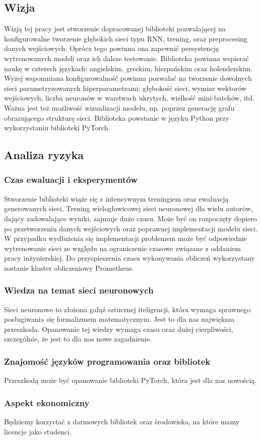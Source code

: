 \subsection{Wizja}
Wizją tej pracy jest stworzenie dopracowanej biblioteki pozwalającej na konfigurowalne tworzenie 
głębokich sieci typu RNN, trening, oraz preprocesing danych wejściowych. Oprócz tego powinna ona 
zapewnić persystencję wytrenowanych modeli oraz ich dalsze testowanie. Biblioteka powinna wspierać 
naukę w czterech językach: angielskim, greckim, hiszpańskim oraz holenderskim. Wyżej wspomniana konfigurowalność powinna 
pozwalać na tworzenie dowolnych sieci parametryzowanych hiperparametrami: głębokość sieci, wymiar 
wektorów wejściowych, liczba neuronów w warstwach ukrytych, wielkość mini-batchów, itd. Ważna jest 
też możliwość wizualizacji modelu, np. poprzez generację grafu obrazującego strukturę sieci. 
Biblioteka powstanie w języku Python przy wykorzystaniu biblioteki PyTorch.

\subsection{Analiza ryzyka}

\subsubsection{Czas ewaluacji i eksperymentów}
Stworzenie biblioteki wiąże się z intensywnym treningiem oraz ewaluacją
generowanych sieci. Trening wielogłowicowej sieci neuronowej dla wielu autorów, dający zadowalające 
wyniki, zajmuje dużo czasu. Może być on rozpoczęty dopiero po przetworzeniu danych wejściowych
oraz poprawnej implementacji modelu sieci. W przypadku wydłużenia się implementacji problemem może być
odpowiednie wytrenowanie sieci ze względu na ograniczenie czasowe związane z oddaniem pracy inżynierskiej.
Do przyspieszenia czasu wykonywania obliczeń wykorzystany zostanie klaster obliczeniowy Prometheus.

\subsubsection{Wiedza na temat sieci neuronowych}
Sieci neuronowe to złożona gałąź sztucznej iteligencji, która wymaga sprawnego posługiwania się formalizmem matematycznym.
Jest to dla nas największa przeszkoda. Opanowanie tej wiedzy wymaga czasu oraz dużej cierpliwości, 
szczególnie, że jest to dla nas nowe zagadnienie.

\subsubsection{Znajomość języków programowania oraz bibliotek }
Przeszkodą może być opanowanie biblioteki PyTorch, która jest dla nas nowością.

\subsubsection{Aspekt ekonomiczny }
Będziemy korzystać z darmowych bibliotek oraz środowiska, na które mamy licencje jako studenci.